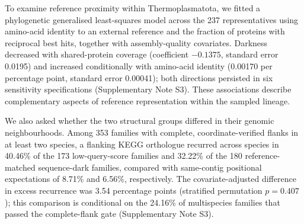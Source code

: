 To examine reference proximity within Thermoplasmatota, we fitted a phylogenetic generalised
least-squares model across the 237 representatives using amino-acid identity to an external
reference and the fraction of proteins with reciprocal best hits, together with assembly-quality
covariates. Darkness decreased with shared-protein coverage (coefficient $-0.1375$, standard
error 0.0195) and increased conditionally with amino-acid identity (0.00170 per percentage point,
standard error 0.00041); both directions persisted in six sensitivity specifications
(Supplementary Note S3). These associations describe complementary aspects of reference
representation within the sampled lineage.

We also asked whether the two structural groups differed in their genomic neighbourhoods.
Among 353 families with complete, coordinate-verified flanks in at least two species,
a flanking KEGG orthologue recurred across species in 40.46\% of the 173 low-query-score families
and 32.22\% of the 180 reference-matched sequence-dark families, compared with same-contig
positional expectations of 8.71\% and 6.56\%, respectively. The covariate-adjusted difference
in excess recurrence was 3.54 percentage points (stratified permutation $p=0.407$);
this comparison is conditional on the 24.16\% of multispecies families that passed the complete-flank
gate (Supplementary Note S3).
